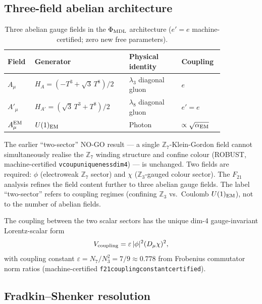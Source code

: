 \documentclass[11pt]{article}
\theoremstyle{remark}
\newcommand{\ZZ}{\mathbb{Z}}
\newcommand{\phimdl}{\Phi_{\rm MDL}}
\newcommand{\Ftwentyone}{F_{21}}
\newcommand{\lean}[1]{%
  \penalty-100
  \begingroup\def\_{\textunderscore\allowbreak}\texttt{#1}\endgroup}
\begin{document}
\subsection{Three-field abelian architecture}
\label{ssec:twosector}

\begin{table}[ht]
\centering
\caption{Three abelian gauge fields in the $\phimdl$ architecture
  ($e' = e$ machine-certified; zero new free parameters).}
\label{tab:threefields}
\begin{tabular}{P{0.10\linewidth}P{0.38\linewidth}P{0.22\linewidth}P{0.15\linewidth}}
\toprule
Field & Generator & Physical identity & Coupling \\
\midrule
$A_\mu$ & $H_A = (-T^3 + \sqrt{3}\,T^8)/2$ & $\lambda_3$ diagonal gluon & $e$ \\
$A'_\mu$ & $H_{A'} = (\sqrt{3}\,T^3 + T^8)/2$ & $\lambda_8$ diagonal gluon & $e' = e$ \\
$A_\mu^{\rm EM}$ & $U(1)_{\rm EM}$ & Photon & $\propto \sqrt{\alpha_{\rm EM}}$ \\
\bottomrule
\end{tabular}
\end{table}

The earlier ``two-sector'' NO-GO result --- a single $\ZZ_7$-Klein-Gordon field
cannot simultaneously realise the $\ZZ_7$ winding structure and confine colour
(ROBUST, machine-certified \lean{vcoup\_uniqueness\_dim4}) --- is unchanged.
Two fields are required: $\phi$ (electroweak $\ZZ_7$ sector) and $\chi$
($\ZZ_3$-gauged colour sector).
The $\Ftwentyone$ analysis refines the field content further to three abelian
gauge fields.
The label ``two-sector'' refers to coupling regimes (confining $\ZZ_3$ vs.\
Coulomb $U(1)_{\rm EM}$), not to the number of abelian fields.

The coupling between the two scalar sectors has the unique dim-4
gauge-invariant Lorentz-scalar form
\begin{equation}
  V_{\rm coupling} = \varepsilon\,|\phi|^2 (D_\mu\chi)^2,
  \label{eq:vcoup}
\end{equation}
with coupling constant $\varepsilon = N_7/N_3^2 = 7/9 \approx 0.778$ from
Frobenius commutator norm ratios (machine-certified
\lean{f21\_coupling\_constant\_certified}).

\subsection{Fradkin--Shenker resolution}
\label{ssec:fs}
\end{document}
